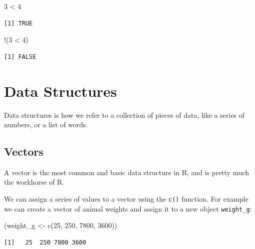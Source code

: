 \documentclass[
  letterpaper,
  DIV=11,
  numbers=noendperiod,
  oneside]{scrreprt}
\newenvironment{Shaded}{\begin{snugshade}}{\end{snugshade}}
\newcommand{\DecValTok}[1]{\textcolor[rgb]{0.68,0.00,0.00}{#1}}
\newcommand{\FunctionTok}[1]{\textcolor[rgb]{0.28,0.35,0.67}{#1}}
\newcommand{\NormalTok}[1]{\textcolor[rgb]{0.00,0.23,0.31}{#1}}
\newcommand{\OtherTok}[1]{\textcolor[rgb]{0.00,0.23,0.31}{#1}}
\newcommand{\SpecialCharTok}[1]{\textcolor[rgb]{0.37,0.37,0.37}{#1}}
\begin{document}
\begin{Shaded}
\begin{Highlighting}[]
\DecValTok{3} \SpecialCharTok{\textless{}} \DecValTok{4} 
\end{Highlighting}
\end{Shaded}

\begin{verbatim}
[1] TRUE
\end{verbatim}

\begin{Shaded}
\begin{Highlighting}[]
\SpecialCharTok{!}\NormalTok{(}\DecValTok{3} \SpecialCharTok{\textless{}} \DecValTok{4}\NormalTok{)}
\end{Highlighting}
\end{Shaded}

\begin{verbatim}
[1] FALSE
\end{verbatim}

\section{Data Structures}\label{data-structures}

Data structures is how we refer to a collection of pieces of data, like
a series of numbers, or a list of words.

\subsection{Vectors}\label{vectors}

A vector is the most common and basic data structure in R, and is pretty
much the workhorse of R.

We can assign a series of values to a vector using the \texttt{c()}
function. For example we can create a vector of animal weights and
assign it to a new object \texttt{weight\_g}:

\begin{Shaded}
\begin{Highlighting}[]
\NormalTok{(weight\_g }\OtherTok{\textless{}{-}} \FunctionTok{c}\NormalTok{(}\DecValTok{25}\NormalTok{, }\DecValTok{250}\NormalTok{, }\DecValTok{7800}\NormalTok{, }\DecValTok{3600}\NormalTok{))}
\end{Highlighting}
\end{Shaded}

\begin{verbatim}
[1]   25  250 7800 3600
\end{verbatim}
\end{document}
